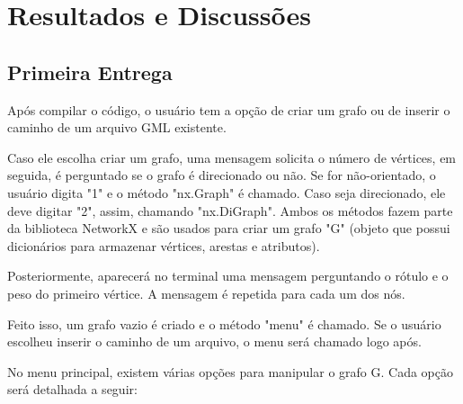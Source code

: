 \documentclass[12pt]{article}
\begin{document}
\section{Resultados e Discussões}
\subsection{Primeira Entrega}

Após compilar o código, o usuário tem a opção de criar um grafo ou de inserir o caminho de um arquivo GML existente.

Caso ele escolha criar um grafo, uma mensagem solicita o número de vértices, em seguida, é perguntado se o grafo é direcionado ou não. Se for não-orientado, o usuário digita "1" e o método "nx.Graph" é chamado. Caso seja direcionado, ele deve digitar "2", assim, chamando "nx.DiGraph". Ambos os métodos fazem parte da biblioteca NetworkX e são usados para criar um grafo "G" (objeto que possui dicionários para armazenar vértices, arestas e atributos).

Posteriormente, aparecerá no terminal uma mensagem perguntando o rótulo e o peso do primeiro vértice. A mensagem é repetida para cada um dos nós.

Feito isso, um grafo vazio é criado e o método "menu" é chamado. Se o usuário escolheu inserir o caminho de um arquivo, o menu será chamado logo após.

No menu principal, existem várias opções para manipular o grafo G. Cada opção será detalhada a seguir:
\end{document}
